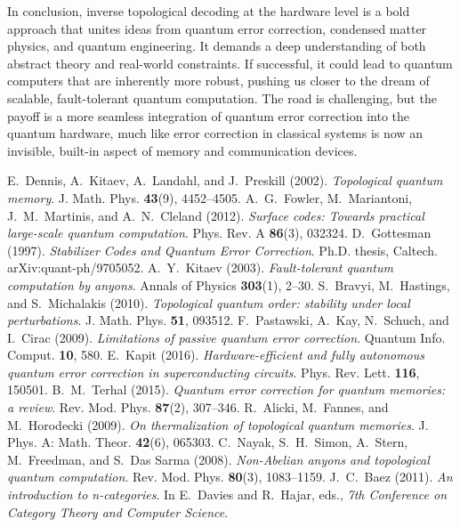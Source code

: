 \documentclass[11pt]{article}
\begin{document}
In conclusion, inverse topological decoding at the hardware level is a bold approach that unites ideas from quantum error correction, condensed matter physics, and quantum engineering. It demands a deep understanding of both abstract theory and real-world constraints. If successful, it could lead to quantum computers that are inherently more robust, pushing us closer to the dream of scalable, fault-tolerant quantum computation. The road is challenging, but the payoff is a more seamless integration of quantum error correction into the quantum hardware, much like error correction in classical systems is now an invisible, built-in aspect of memory and communication devices. 

\begin{thebibliography}{99}
 E.~Dennis, A.~Kitaev, A.~Landahl, and J.~Preskill (2002). \textit{Topological quantum memory}. J. Math. Phys. \textbf{43}(9), 4452–4505.
 A.~G.~Fowler, M.~Mariantoni, J.~M.~Martinis, and A.~N.~Cleland (2012). \textit{Surface codes: Towards practical large-scale quantum computation}. Phys. Rev. A \textbf{86}(3), 032324.
 D.~Gottesman (1997). \textit{Stabilizer Codes and Quantum Error Correction}. Ph.D. thesis, Caltech. arXiv:quant-ph/9705052.
 A.~Y.~Kitaev (2003). \textit{Fault-tolerant quantum computation by anyons}. Annals of Physics \textbf{303}(1), 2–30.
 S.~Bravyi, M.~Hastings, and S.~Michalakis (2010). \textit{Topological quantum order: stability under local perturbations}. J. Math. Phys. \textbf{51}, 093512.
 F.~Pastawski, A.~Kay, N.~Schuch, and I.~Cirac (2009). \textit{Limitations of passive quantum error correction}. Quantum Info. Comput. \textbf{10}, 580.
 E.~Kapit (2016). \textit{Hardware-efficient and fully autonomous quantum error correction in superconducting circuits}. Phys. Rev. Lett. \textbf{116}, 150501.
 B.~M.~Terhal (2015). \textit{Quantum error correction for quantum memories: a review}. Rev. Mod. Phys. \textbf{87}(2), 307–346.
 R.~Alicki, M.~Fannes, and M.~Horodecki (2009). \textit{On thermalization of topological quantum memories}. J. Phys. A: Math. Theor. \textbf{42}(6), 065303.
 C.~Nayak, S.~H.~Simon, A.~Stern, M.~Freedman, and S.~Das Sarma (2008). \textit{Non-Abelian anyons and topological quantum computation}. Rev. Mod. Phys. \textbf{80}(3), 1083–1159.
 J.~C.~Baez (2011). \textit{An introduction to n-categories}. In E.~Davies and R.~Hajar, eds., \textit{7th Conference on Category Theory and Computer Science}.

\end{thebibliography}
\end{document}
